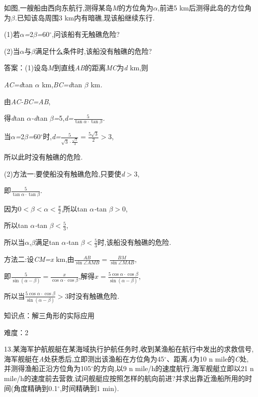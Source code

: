 \documentclass{article} %
\begin{document}
 如图,一艘船由西向东航行,测得某岛\textit{M}的方位角为\textit{$\alpha$},前进5 km后测得此岛的方位角为\textit{$\beta$.}已知该岛周围3 km内有暗礁,现该船继续东行\textit{.}

 (1)若\textit{$\alpha$=}2\textit{$\beta$=}60$\mathrm{{}^\circ}$,问该船有无触礁危险?

 (2)当\textit{$\alpha$}与\textit{$\beta$}满足什么条件时,该船没有触礁的危险?

 答案：(1)设岛\textit{M}到直线\textit{AB}的距离\textit{MC}为\textit{d} km,则

\textit{AC=d}tan \textit{$\alpha$} km,\textit{BC=d}tan \textit{$\beta$} km\textit{.}

由\textit{AC-BC=AB},

得\textit{d}tan \textit{$\alpha$-d}tan \textit{$\beta$=}5,\textit{d=}$\frac{5}{\tan \alpha\cdot\tan\beta}$.

当\textit{$\alpha$=}2\textit{$\beta$=}60$\mathrm{{}^\circ}$时,\textit{d=}$\frac{5}{\sqrt{3}\cdot\frac{\sqrt{3}}{3}}=\frac{5\sqrt{3}}{2}>3$,

所以此时没有触礁的危险\textit{.}

(2)方法一:要使船没有触礁危险,只要使\textit{d$>$}3,

即$\frac{5}{\tan\alpha\cdot\tan\beta}$.

因为0\textit{$<$$\beta$$<$$\alpha$$<\frac{\pi}{2}$},所以tan \textit{$\alpha$-}tan \textit{$\beta$$>$}0,

所以tan \textit{$\alpha$-}tan \textit{$\beta$$<\frac{5}{3}$},

所以当\textit{$\alpha$},\textit{$\beta$}满足tan \textit{$\alpha$-}tan \textit{$\beta$$<\frac{5}{3}$}时,该船没有触礁的危险\textit{.}

方法二:设\textit{CM=x} km,由$\frac{AB}{\sin\angle AMB}=\frac{BM}{\sin\angle MAB}$,

即$\frac{5}{\sin(\alpha-\beta)}=\frac{x}{\cos\alpha\cdot\cos\beta}$,解得$x=\frac{5\cos\alpha\cdot\cos\beta}{\sin(\alpha-\beta)}$,

所以当$\frac{5\cos\alpha\cdot\cos\beta}{\sin(\alpha-\beta)}>3$时没有触礁危险\textit{.}

知识点：解三角形的实际应用

难度：2

 13\textit{.}某海军护航舰艇在某海域执行护航任务时,收到某渔船在航行中发出的求救信号,海军舰艇在\textit{A}处获悉后,立即测出该渔船在方位角为45$\mathrm{{}^\circ}$、距离\textit{A}为10 n mile的\textit{C}处,并测得渔船正沿方位角为105$\mathrm{{}^\circ}$的方向,以9 n mile/h的速度航行,海军舰艇立即以21 n mile/h的速度前去营救,试问舰艇应按照怎样的航向前进?并求出靠近渔船所用的时间(角度精确到0\textit{.}1$\mathrm{{}^\circ}$,时间精确到1 min)\textit{.}
\end{document}
